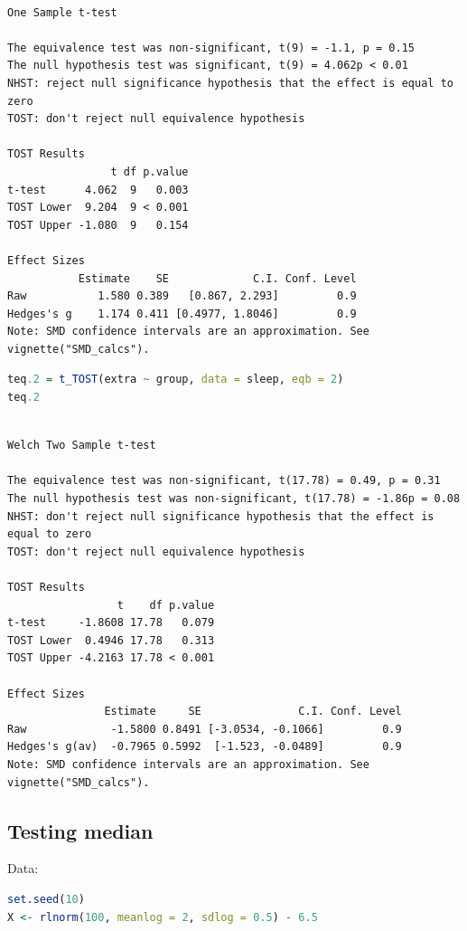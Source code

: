 \documentclass{article}
\begin{document}
\label{}
\begin{verbatim}

One Sample t-test

The equivalence test was non-significant, t(9) = -1.1, p = 0.15
The null hypothesis test was significant, t(9) = 4.062p < 0.01
NHST: reject null significance hypothesis that the effect is equal to zero 
TOST: don't reject null equivalence hypothesis

TOST Results 
                t df p.value
t-test      4.062  9   0.003
TOST Lower  9.204  9 < 0.001
TOST Upper -1.080  9   0.154

Effect Sizes 
           Estimate    SE             C.I. Conf. Level
Raw           1.580 0.389   [0.867, 2.293]         0.9
Hedges's g    1.174 0.411 [0.4977, 1.8046]         0.9
Note: SMD confidence intervals are an approximation. See vignette("SMD_calcs").
\end{verbatim}

\begin{lstlisting}[language=r,numbers=none]
teq.2 = t_TOST(extra ~ group, data = sleep, eqb = 2)
teq.2
\end{lstlisting}

\label{}
\begin{verbatim}

Welch Two Sample t-test

The equivalence test was non-significant, t(17.78) = 0.49, p = 0.31
The null hypothesis test was non-significant, t(17.78) = -1.86p = 0.08
NHST: don't reject null significance hypothesis that the effect is equal to zero 
TOST: don't reject null equivalence hypothesis

TOST Results 
                 t    df p.value
t-test     -1.8608 17.78   0.079
TOST Lower  0.4946 17.78   0.313
TOST Upper -4.2163 17.78 < 0.001

Effect Sizes 
               Estimate     SE               C.I. Conf. Level
Raw             -1.5800 0.8491 [-3.0534, -0.1066]         0.9
Hedges's g(av)  -0.7965 0.5992  [-1.523, -0.0489]         0.9
Note: SMD confidence intervals are an approximation. See vignette("SMD_calcs").
\end{verbatim}
\subsection{Testing median}
\label{sec:org1718b6e}

Data:
\begin{lstlisting}[language=r,numbers=none]
set.seed(10)
X <- rlnorm(100, meanlog = 2, sdlog = 0.5) - 6.5
\end{lstlisting}
\end{document}
